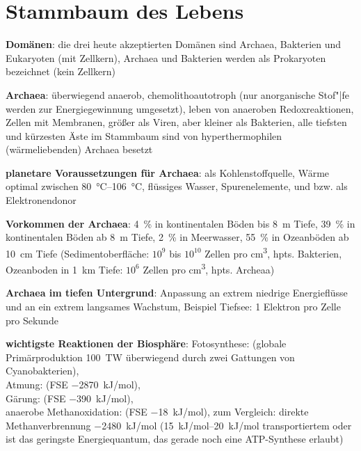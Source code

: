\pagebreak

\section{%
    Stammbaum des Lebens%
}

\textbf{Domänen}:
die drei heute akzeptierten Domänen sind Archaea, Bakterien und Eukaryoten (mit Zellkern),
Archaea und Bakterien werden als Prokaryoten bezeichnet (kein Zellkern)

\textbf{Archaea}:
überwiegend anaerob,
chemolithoautotroph (nur anorganische Stof"|fe werden zur Energiegewinnung umgesetzt),
leben von anaeroben Redoxreaktionen,
Zellen mit Membranen,
größer als Viren, aber kleiner als Bakterien,
alle tiefsten und kürzesten Äste im Stammbaum sind von hyperthermophilen (wärmeliebenden)
Archaea besetzt

\textbf{planetare Voraussetzungen für Archaea}:
 als Kohlenstoffquelle,
Wärme optimal zwischen \SIrange{80}{106}{\celsius},
flüssiges Wasser,
Spurenelemente,
 und  bzw.  als Elektronendonor

\textbf{Vorkommen der Archaea}:
\SI{4}{\percent} in kontinentalen Böden bis \SI{8}{\meter} Tiefe,
\SI{39}{\percent} in kontinentalen Böden ab \SI{8}{\meter} Tiefe,
\SI{2}{\percent} in Meerwasser,
\SI{55}{\percent} in Ozeanböden ab \SI{10}{\centi\meter} Tiefe
(Sedimentoberfläche: $10^9$ bis $10^{10}$ Zellen pro \si{\centi\meter\cubed}, hpts. Bakterien,
Ozeanboden in \SI{1}{\kilo\meter} Tiefe: $10^6$ Zellen pro \si{\centi\meter\cubed}, hpts. Archeaa)

\textbf{Archaea im tiefen Untergrund}:
Anpassung an extrem niedrige Energieflüsse und an ein extrem langsames Wachstum,
Beispiel Tiefsee: 1 Elektron pro Zelle pro Sekunde

\textbf{wichtigste Reaktionen der Biosphäre}:
Fotosynthese:  (globale Primärproduktion \SI{100}{\tera\watt}
überwiegend durch zwei Gattungen von Cyanobakterien),\\
Atmung:  (FSE \SI{-2870}{\kilo\joule/\mol}),\\
Gärung:  (FSE \SI{-390}{\kilo\joule/\mol}),\\
anaerobe Methanoxidation: 
(FSE \SI{-18}{\kilo\joule/\mol}),
zum Vergleich: direkte Methanverbrennung \SI{-2480}{\kilo\joule/\mol}
(\SIrange{+15}{20}{\kilo\joule/\mol} transportiertem  oder  ist
das geringste Energiequantum, das gerade noch eine ATP-Synthese erlaubt)

